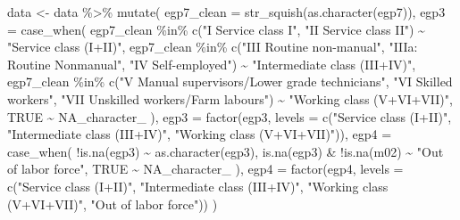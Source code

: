 \documentclass[
  spanish,
  a4paper,
  oneside]{scrbook}
\newenvironment{Shaded}{\begin{snugshade}}{\end{snugshade}}
\newcommand{\AttributeTok}[1]{\textcolor[rgb]{0.40,0.45,0.13}{#1}}
\newcommand{\ConstantTok}[1]{\textcolor[rgb]{0.56,0.35,0.01}{#1}}
\newcommand{\FunctionTok}[1]{\textcolor[rgb]{0.28,0.35,0.67}{#1}}
\newcommand{\NormalTok}[1]{\textcolor[rgb]{0.00,0.23,0.31}{#1}}
\newcommand{\OtherTok}[1]{\textcolor[rgb]{0.00,0.23,0.31}{#1}}
\newcommand{\SpecialCharTok}[1]{\textcolor[rgb]{0.37,0.37,0.37}{#1}}
\newcommand{\StringTok}[1]{\textcolor[rgb]{0.13,0.47,0.30}{#1}}
\begin{document}
\begin{Shaded}
\begin{Highlighting}[]
\NormalTok{data }\OtherTok{\textless{}{-}}\NormalTok{ data }\SpecialCharTok{\%\textgreater{}\%}
  \FunctionTok{mutate}\NormalTok{(}
    \AttributeTok{egp7\_clean =} \FunctionTok{str\_squish}\NormalTok{(}\FunctionTok{as.character}\NormalTok{(egp7)),}
    \AttributeTok{egp3 =} \FunctionTok{case\_when}\NormalTok{(}
\NormalTok{      egp7\_clean }\SpecialCharTok{\%in\%} \FunctionTok{c}\NormalTok{(}\StringTok{"\textquotesingle{}I Service class I\textquotesingle{}"}\NormalTok{,}
                         \StringTok{"\textquotesingle{}II Service class II\textquotesingle{}"}\NormalTok{)                }\SpecialCharTok{\textasciitilde{}} \StringTok{"Service class (I+II)"}\NormalTok{,}
\NormalTok{      egp7\_clean }\SpecialCharTok{\%in\%} \FunctionTok{c}\NormalTok{(}\StringTok{"\textquotesingle{}III Routine non{-}manual\textquotesingle{}"}\NormalTok{,}
                         \StringTok{"\textquotesingle{}IIIa: Routine Nonmanual\textquotesingle{}"}\NormalTok{,}
                         \StringTok{"\textquotesingle{}IV Self{-}employed\textquotesingle{}"}\NormalTok{)                   }\SpecialCharTok{\textasciitilde{}} \StringTok{"Intermediate class (III+IV)"}\NormalTok{,}
\NormalTok{      egp7\_clean }\SpecialCharTok{\%in\%} \FunctionTok{c}\NormalTok{(}\StringTok{"\textquotesingle{}V Manual supervisors/Lower grade technicians\textquotesingle{}"}\NormalTok{,}
                         \StringTok{"\textquotesingle{}VI Skilled workers\textquotesingle{}"}\NormalTok{,}
                         \StringTok{"\textquotesingle{}VII Unskilled workers/Farm labours\textquotesingle{}"}\NormalTok{) }\SpecialCharTok{\textasciitilde{}} \StringTok{"Working class (V+VI+VII)"}\NormalTok{,}
      \ConstantTok{TRUE} \SpecialCharTok{\textasciitilde{}} \ConstantTok{NA\_character\_}
\NormalTok{    ),}
    \AttributeTok{egp3 =} \FunctionTok{factor}\NormalTok{(egp3, }\AttributeTok{levels =} \FunctionTok{c}\NormalTok{(}\StringTok{"Service class (I+II)"}\NormalTok{,}
                                    \StringTok{"Intermediate class (III+IV)"}\NormalTok{,}
                                    \StringTok{"Working class (V+VI+VII)"}\NormalTok{)),}
    \AttributeTok{egp4 =} \FunctionTok{case\_when}\NormalTok{(}
      \SpecialCharTok{!}\FunctionTok{is.na}\NormalTok{(egp3)               }\SpecialCharTok{\textasciitilde{}} \FunctionTok{as.character}\NormalTok{(egp3),}
      \FunctionTok{is.na}\NormalTok{(egp3) }\SpecialCharTok{\&} \SpecialCharTok{!}\FunctionTok{is.na}\NormalTok{(m02) }\SpecialCharTok{\textasciitilde{}} \StringTok{"Out of labor force"}\NormalTok{,}
      \ConstantTok{TRUE}                       \SpecialCharTok{\textasciitilde{}} \ConstantTok{NA\_character\_}
\NormalTok{    ),}
    \AttributeTok{egp4 =} \FunctionTok{factor}\NormalTok{(egp4, }\AttributeTok{levels =} \FunctionTok{c}\NormalTok{(}\StringTok{"Service class (I+II)"}\NormalTok{,}
                                    \StringTok{"Intermediate class (III+IV)"}\NormalTok{,}
                                    \StringTok{"Working class (V+VI+VII)"}\NormalTok{,}
                                    \StringTok{"Out of labor force"}\NormalTok{))}
\NormalTok{  )}


\end{Highlighting}
\end{Shaded}
\end{document}
